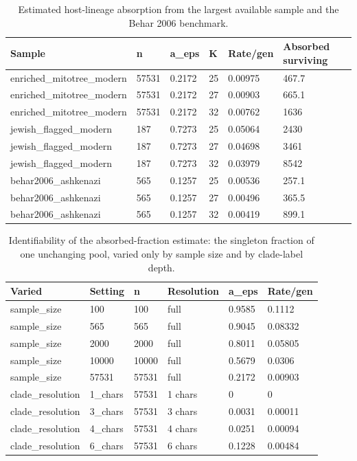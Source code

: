 \documentclass[11pt]{article}
\begin{document}
\begin{table}[htbp]
\centering
\footnotesize
\caption{Estimated host-lineage absorption from the largest available sample and the Behar 2006 benchmark.}
\label{tab:abs}
\begin{tabular}{llllll}
\toprule
Sample & n & a\_eps & K & Rate/gen & Absorbed surviving \\
\midrule
enriched\_mitotree\_modern & 57531 & 0.2172 &    25 & 0.00975 & 467.7 \\
enriched\_mitotree\_modern & 57531 & 0.2172 &    27 & 0.00903 & 665.1 \\
enriched\_mitotree\_modern & 57531 & 0.2172 &    32 & 0.00762 &  1636 \\
jewish\_flagged\_modern &   187 & 0.7273 &    25 & 0.05064 &  2430 \\
jewish\_flagged\_modern &   187 & 0.7273 &    27 & 0.04698 &  3461 \\
jewish\_flagged\_modern &   187 & 0.7273 &    32 & 0.03979 &  8542 \\
behar2006\_ashkenazi &   565 & 0.1257 &    25 & 0.00536 & 257.1 \\
behar2006\_ashkenazi &   565 & 0.1257 &    27 & 0.00496 & 365.5 \\
behar2006\_ashkenazi &   565 & 0.1257 &    32 & 0.00419 & 899.1 \\
\bottomrule
\end{tabular}
\end{table}
\begin{table}[htbp]
\centering
\footnotesize
\caption{Identifiability of the absorbed-fraction estimate: the singleton fraction of one unchanging pool, varied only by sample size and by clade-label depth.}
\label{tab:absid}
\begin{tabular}{llllll}
\toprule
Varied & Setting & n & Resolution & a\_eps & Rate/gen \\
\midrule
sample\_size & 100 &   100 & full & 0.9585 & 0.1112 \\
sample\_size & 565 &   565 & full & 0.9045 & 0.08332 \\
sample\_size & 2000 &  2000 & full & 0.8011 & 0.05805 \\
sample\_size & 10000 & 10000 & full & 0.5679 & 0.0306 \\
sample\_size & 57531 & 57531 & full & 0.2172 & 0.00903 \\
clade\_resolution & 1\_chars & 57531 & 1 chars & 0 & 0 \\
clade\_resolution & 3\_chars & 57531 & 3 chars & 0.0031 & 0.00011 \\
clade\_resolution & 4\_chars & 57531 & 4 chars & 0.0251 & 0.00094 \\
clade\_resolution & 6\_chars & 57531 & 6 chars & 0.1228 & 0.00484 \\
\bottomrule
\end{tabular}
\end{table}
\end{document}
